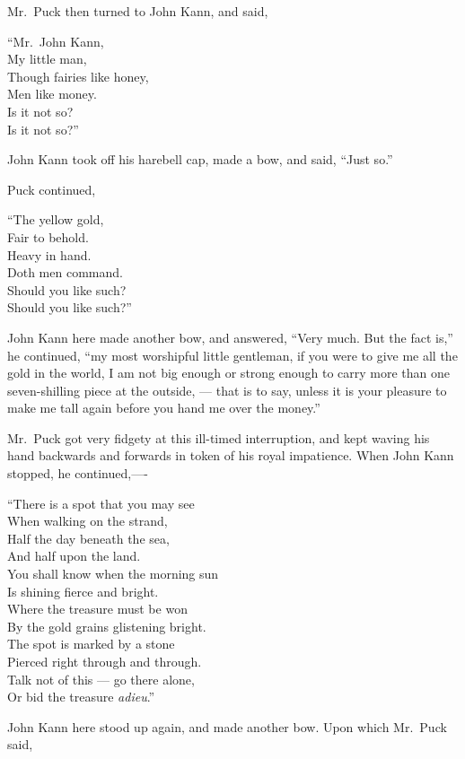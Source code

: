 \documentclass[
  12pt,
  a5paper,
  twoside]{book}
\begin{document}
Mr.~Puck then turned to John Kann, and said,

``Mr.~John Kann,\\
My little man,\\
Though fairies like honey,\\
Men like money.\\
Is it not so?\\
Is it not so?''

John Kann took off his harebell cap, made a bow, and said, ``Just so.''

Puck continued,

``The yellow gold,\\
Fair to behold.\\
Heavy in hand.\\
Doth men command.\\
Should you like such?\\
Should you like such?''

John Kann here made another bow, and answered, ``Very much. But the fact
is,'' he continued, ``my most worshipful little gentleman, if you were
to give me all the gold in the world, I am not big enough or strong
enough to carry more than one seven-shilling piece at the outside, ---
that is to say, unless it is your pleasure to make me tall again before
you hand me over the money.''

Mr.~Puck got very fidgety at this ill-timed interruption, and kept
waving his hand backwards and forwards in token of his royal impatience.
When John Kann stopped, he continued,----

``There is a spot that you may see\\
When walking on the strand,\\
Half the day beneath the sea,\\
And half upon the land.\\
You shall know when the morning sun\\
Is shining fierce and bright.\\
Where the treasure must be won\\
By the gold grains glistening bright.\\
The spot is marked by a stone\\
Pierced right through and through.\\
Talk not of this --- go there alone,\\
Or bid the treasure \emph{adieu}.''

John Kann here stood up again, and made another bow. Upon which Mr.~Puck
said,
\end{document}
